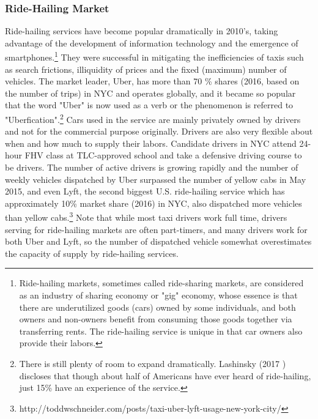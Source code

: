 \vspace{0.5cm}
\subsubsection{Ride-Hailing Market}
\hspace{0.5cm} Ride-hailing services have become popular dramatically in 2010's, taking advantage of the development of information technology and the emergence of smartphones.\footnote{Ride-hailing markets, sometimes called ride-sharing markets, are considered as an industry of sharing economy or "gig" economy, whose essence is that there are underutilized goods (cars) owned by some individuals, and both owners and non-owners benefit from consuming those goods together via transferring rents. The ride-hailing service is unique in that car owners also provide their labors.} They were successful in mitigating the inefficiencies of taxis such as search frictions, illiquidity of prices and the fixed (maximum) number of vehicles. The market leader, Uber, has more than 70 \% shares (2016, based on the number of trips) in NYC and operates globally, and it became so popular that the word "Uber" is now used as a verb or the phenomenon is referred to "Uberfication".\footnote{There is still plenty of room to expand dramatically. Lashinsky (2017 \cite{wildride2017}) discloses that though about half of Americans have ever heard of ride-hailing, just 15\% have an experience of the service.} Cars used in the service are mainly privately owned by drivers and not for the commercial purpose originally. Drivers are also very flexible about when and how much to supply their labors. Candidate drivers in NYC attend 24-hour FHV class at TLC-approved school and take a defensive driving course to be drivers. The number of active drivers is growing rapidly and the number of weekly vehicles dispatched by Uber surpassed the number of yellow cabs in May 2015, and even Lyft, the second biggest U.S. ride-hailing service which has approximately 10\% market share (2016) in NYC, also dispatched more vehicles than yellow cabs.\footnote{http://toddwschneider.com/posts/taxi-uber-lyft-usage-new-york-city/} Note that while most taxi drivers work full time, drivers serving for ride-hailing markets are often part-timers, and many drivers work for both Uber and Lyft, so the number of dispatched vehicle somewhat overestimates the capacity of supply by ride-hailing services.

